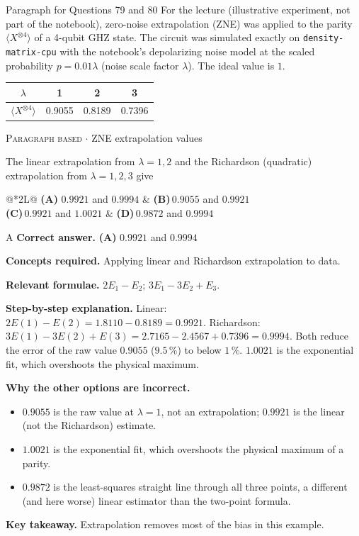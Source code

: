 \documentclass[11pt,a4paper]{article}
\newcommand{\optlabel}[1]{\textbf{(#1)}}
\newcommand{\correctlabel}[1]{\textcolor{okgreen}{\textbf{(#1)}\,\ding{51}}}
\newenvironment{qitem}[1]{\begin{list}{}{\setlength{\leftmargin}{3.3em}\setlength{\labelwidth}{3.1em}%
  \setlength{\labelsep}{0.2em}\setlength{\topsep}{3pt}\setlength{\parsep}{3pt}}\item[\textbf{Q.#1}\hfill]}{\end{list}}
\newcommand{\qmeta}[2]{{\footnotesize\color{black!60}\textsc{#1} \;$\cdot$\; #2}\par}
\begin{document}
\begin{passagebox}{Paragraph for Questions 79 and 80}
For the lecture (illustrative experiment, not part of the notebook), zero-noise extrapolation (ZNE) was applied to the parity
$\langle X^{\otimes4}\rangle$ of a 4-qubit GHZ state. The circuit was simulated exactly on \texttt{density-matrix-cpu} with the notebook's
depolarizing noise model at the scaled probability $p = 0.01\lambda$ (noise scale factor $\lambda$). The ideal value is $1$.
\begin{center}\small
\begin{tabular}{cccc}\toprule $\lambda$ & 1 & 2 & 3\\ \midrule $\langle X^{\otimes4}\rangle$ & 0.9055 & 0.8189 & 0.7396\\ \bottomrule\end{tabular}
\end{center}
\end{passagebox}
\begin{qitem}{79}
\qmeta{Paragraph based}{ZNE extrapolation values}
The linear extrapolation from $\lambda = 1, 2$ and the Richardson (quadratic) extrapolation from $\lambda = 1, 2, 3$ give
\par\smallskip\noindent\begin{tabularx}{\linewidth}{@{}*{2}{L}@{}}
\correctlabel{A}\,$0.9921$ and $0.9994$ & \optlabel{B}\,$0.9055$ and $0.9921$ \\[3pt]
\optlabel{C}\,$0.9921$ and $1.0021$ & \optlabel{D}\,$0.9872$ and $0.9994$
\end{tabularx}
\end{qitem}
\begin{solbox}{A}
\textbf{\color{brand}Correct answer.} \textcolor{okgreen}{\textbf{(A)}} $0.9921$ and $0.9994$

\textbf{\color{brand}Concepts required.} Applying linear and Richardson extrapolation to data.

\textbf{\color{brand}Relevant formulae.} $2E_1 - E_2$; $3E_1 - 3E_2 + E_3$.

\textbf{\color{brand}Step-by-step explanation.} Linear: $2E(1) - E(2) = 1.8110 - 0.8189 = 0.9921$. Richardson: $3E(1) - 3E(2) + E(3) = 2.7165 - 2.4567 + 0.7396 = 0.9994$.
Both reduce the error of the raw value $0.9055$ ($9.5\,\%$) to below $1\,\%$. $1.0021$ is the exponential fit, which overshoots the physical maximum.

\textbf{\color{brand}Why the other options are incorrect.}
\begin{itemize}[leftmargin=2.4em, itemsep=1pt, topsep=2pt]
\item[\textbf{(B)}] $0.9055$ is the raw value at $\lambda = 1$, not an extrapolation; $0.9921$ is the linear (not the Richardson) estimate.
\item[\textbf{(C)}] $1.0021$ is the exponential fit, which overshoots the physical maximum of a parity.
\item[\textbf{(D)}] $0.9872$ is the least-squares straight line through all three points, a different (and here worse) linear estimator than the two-point formula.
\end{itemize}
\textbf{\color{brand}Key takeaway.} Extrapolation removes most of the bias in this example.
\end{solbox}
\end{document}
